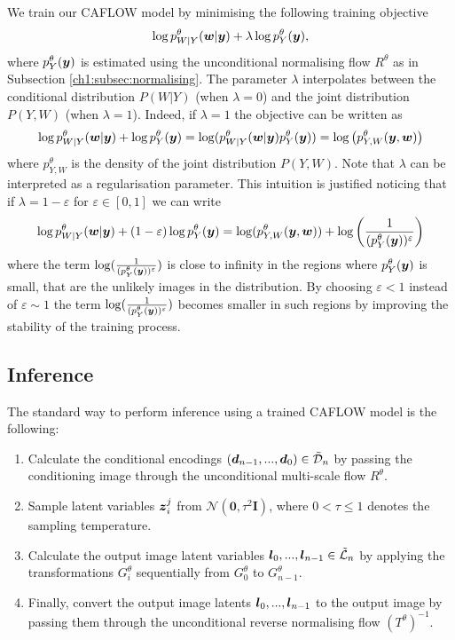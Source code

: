 We train our CAFLOW model by minimising the following training objective \begin{align*}
        \log p^\theta_{W|Y}(\boldsymbol{w} | \boldsymbol{y}) + \lambda \log p^\theta_{Y}(\boldsymbol{y}),
        \end{align*}
        where $p^\theta_{Y}(\boldsymbol{y})$ is estimated using the unconditional normalising flow $R^\theta$ as in Subsection \ref{ch1:subsec:normalising}.
        The parameter $\lambda$ interpolates between the conditional distribution $P(W|Y)$ (when $\lambda = 0$) and the joint distribution $P(Y,W)$ (when $\lambda = 1$).
        Indeed, if $\lambda = 1$ the objective can be written as
        \begin{align}
        \log p^\theta_{W|Y}(\boldsymbol{w} | \boldsymbol{y}) +  \log p^\theta_{Y}(\boldsymbol{y}) = \log (p^\theta_{W|Y}(\boldsymbol{w} | \boldsymbol{y})p^\theta_{Y}(\boldsymbol{y})) = \log\left(p^\theta_{Y,W}(\boldsymbol{y},\boldsymbol{w})\right)
        \end{align}
        where $p^\theta_{Y,W}$ is the density of the joint distribution $P(Y,W)$.
        Note that $\lambda$ can be interpreted as a regularisation parameter. This intuition is justified noticing that if $\lambda = 1 - \varepsilon$ for $\varepsilon \in [0,1]$ we can write
        \begin{align}
           \log p^\theta_{W|Y}(\boldsymbol{w} | \boldsymbol{y}) +  (1-\varepsilon) \log p^\theta_{Y}(\boldsymbol{y}) =  \log(p^\theta_{Y,W}(\boldsymbol{y},\boldsymbol{w})) + \log\left(\frac{1}{(p^\theta_Y(\boldsymbol{y}))^\varepsilon}\right)  
        \end{align}
        where the term $\log(\frac{1}{(p^\theta_Y(\boldsymbol{y}))^\varepsilon})$ 
        is close to infinity in the regions where $p^\theta_Y(\boldsymbol{y})$ is small, that are the unlikely images in the distribution. By choosing $\varepsilon < 1$ instead of $\varepsilon \sim 1$ the term $\log(\frac{1}{(p^\theta_Y(\boldsymbol{y}))^\varepsilon})$ becomes smaller in such regions by improving the stability of the training process. 
    

\subsection{Inference}

The standard way to perform inference using a trained CAFLOW model is the following: 
\begin{enumerate}
        \item Calculate the conditional encodings $(\boldsymbol{d}_{n-1},...,\boldsymbol{d}_0) \in \tilde{\mathcal{D}}_n$ by passing the conditioning image through the unconditional multi-scale flow $R^\theta$.
        \item Sample latent variables $\boldsymbol{z}_i^j$ from $\mathcal{N}(\textbf{0},\tau^2 \textbf{I})$, where $0<\tau \leq 1$ denotes the sampling temperature.
        \item Calculate the output image latent variables $\boldsymbol{l}_0,...,\boldsymbol{l}_{n-1} \in \tilde{\mathcal{L}}_n$ by applying the transformations $G^\theta_i$ sequentially from $G^\theta_0$ to $G^\theta_{n-1}$.
        \item Finally, convert the output image latents $\boldsymbol{l}_0,...,\boldsymbol{l}_{n-1}$ to the output image by passing them through the unconditional reverse normalising flow $(T^\theta)^{-1}$.
\end{enumerate}

